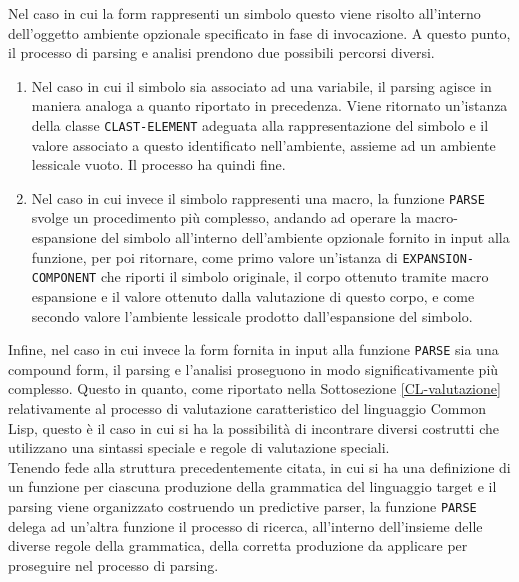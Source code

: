 Nel caso in cui la form rappresenti un simbolo questo viene risolto all’interno
dell’oggetto ambiente opzionale specificato in fase di invocazione. A questo
punto, il processo di parsing e analisi prendono due possibili percorsi diversi.

\begin{enumerate}

\item Nel caso in cui il simbolo sia associato ad una variabile, il parsing
agisce in maniera analoga a quanto riportato in precedenza. Viene ritornato
un’istanza della classe \texttt{CLAST-ELEMENT} adeguata alla rappresentazione
del simbolo e il valore associato a questo identificato nell’ambiente, assieme
ad un ambiente lessicale vuoto. Il processo ha quindi fine.

\item Nel caso in cui invece il simbolo rappresenti una macro, la funzione
\texttt{PARSE} svolge un procedimento più complesso, andando ad operare la
macro-espansione del simbolo all’interno dell’ambiente opzionale fornito in
input alla funzione, per poi ritornare, come primo valore un’istanza di \texttt
{EXPANSION-COMPONENT} che riporti il simbolo originale, il corpo ottenuto
tramite macro espansione e il valore ottenuto dalla valutazione di questo corpo,
e come secondo valore l’ambiente lessicale prodotto dall’espansione del simbolo.

\end{enumerate}

Infine, nel caso in cui invece la form fornita in input alla funzione
\texttt{PARSE} sia una compound form, il parsing e l’analisi proseguono in modo
significativamente più complesso. Questo in quanto, come riportato nella
Sottosezione \ref{CL-valutazione} relativamente al processo di valutazione
caratteristico del linguaggio Common Lisp, questo è il caso in cui si ha la
possibilità di incontrare diversi costrutti che utilizzano una sintassi speciale
e regole di valutazione speciali.\\

Tenendo fede alla struttura precedentemente citata, in cui si ha una definizione
di un funzione per ciascuna produzione della grammatica del linguaggio target e
il parsing viene organizzato costruendo un predictive parser, la funzione
\texttt{PARSE} delega ad un’altra funzione il processo di ricerca, all’interno
dell’insieme delle diverse regole della grammatica, della corretta produzione da
applicare per proseguire nel processo di parsing.\\

